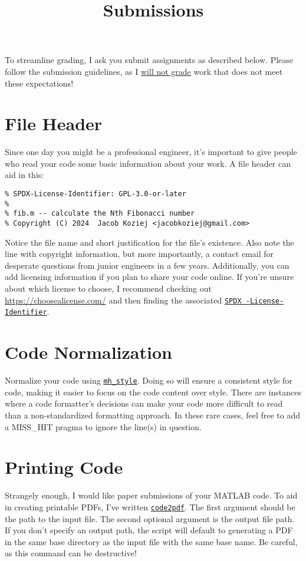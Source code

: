 \documentclass{article}
\title{Submissions}
\begin{document}
\renderTitle

To streamline grading, I ask you submit assignments as described below.
Please follow the submission guidelines, as I \underline{will not grade}
work that does not meet these expectations!

\section{File Header}

Since one day you might be a professional engineer, it's important to
give people who read your code some basic information about your work. A
file header can aid in this:

\begin{verbatim}
% SPDX-License-Identifier: GPL-3.0-or-later
%
% fib.m -- calculate the Nth Fibonacci number
% Copyright (C) 2024  Jacob Koziej <jacobkoziej@gmail.com>
\end{verbatim}

Notice the file name and short justification for the file's existence.
Also note the line with copyright information, but more importantly, a
contact email for desperate questions from junior engineers in a few
years.  Additionally, you can add licensing information if you plan to
share your code online.  If you're unsure about which license to choose,
I recommend checking out \url{https://choosealicense.com/} and then
finding the associated \href{https://spdx.org/licenses/}{\texttt{SPDX%
-License-Identifier}}.

\section{Code Normalization}

Normalize your code using \href{https://florianschanda.github.io/%
miss_hit/style_checker.html}{\texttt{mh\_style}}.  Doing so will ensure
a consistent style for code, making it easier to focus on the code
content over style.  There are instances where a code formatter's
decisions can make your code more difficult to read than a
non-standardized formatting approach.  In these rare cases, feel free to
add a MISS\_HIT pragma to ignore the line(s) in question.

\section{Printing Code}

Strangely enough, I would like paper submissions of your MATLAB code.
To aid in creating printable PDFs, I've written \href{https://github.%
com/jacobkoziej/jk-ece210/blob/master/bin/code2pdf}{\texttt{code2pdf}}.
The first argument should be the path to the input file.  The second
optional argument is the output file path.  If you don't specify an
output path, the script will default to generating a PDF in the same
base directory as the input file with the same base name.  Be careful,
as this command can be destructive!
\end{document}

